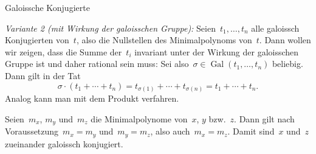 \documentclass{algblatt}
\begin{document}
\begin{aufgabe}{Galoissche Konjugierte}
\begin{loesungE}
\emph{Variante 2 (mit Wirkung der galoisschen Gruppe):}
Seien~$t_1,\ldots,t_n$ alle galoissch Konjugierten von~$t$, also die
Nullstellen des Minimalpolynoms von~$t$. Dann wollen wir zeigen, dass die
Summe der~$t_i$ invariant unter der Wirkung der galoisschen Gruppe ist und
daher rational sein muss: Sei also~$\sigma \in
\operatorname{Gal}(t_1,\ldots,t_n)$ beliebig. Dann gilt in der Tat
\[ \sigma \cdot (t_1 + \cdots + t_n) =
  t_{\sigma(1)} + \cdots + t_{\sigma(n)} =
  t_1 + \cdots + t_n. \]
Analog kann man mit dem Produkt verfahren.

\item Seien~$m_x$, $m_y$ und~$m_z$ die Minimalpolynome von~$x$, $y$ bzw.~$z$.
Dann gilt nach Voraussetzung~$m_x = m_y$ und~$m_y = m_z$, also auch~$m_x =
m_z$. Damit sind~$x$ und~$z$ zueinander galoissch konjugiert.
\end{loesungE}
\end{aufgabe}
\end{document}
